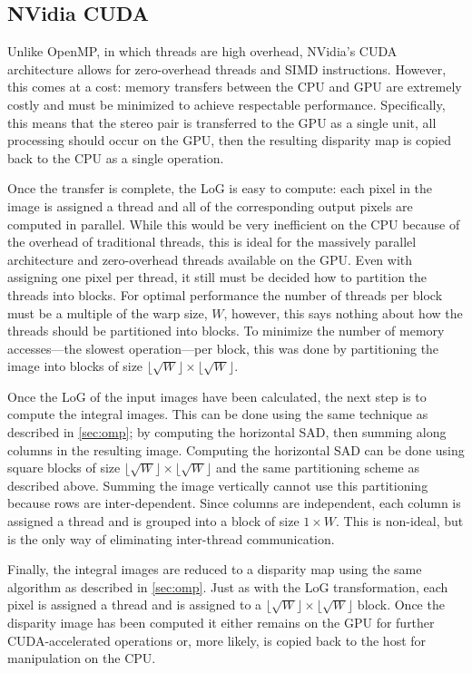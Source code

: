 \documentclass{article}
\let\orgautoref\autoref
\providecommand{\Cref}
        {\def\equationautorefname{Equation}%
         \def\figureautorefname{Figure}%
         \def\subfigureautorefname{Figure}%
         \def\Itemautorefname{Item}%
         \def\tableautorefname{Table}%
         \def\sectionautorefname{Section}%
         \def\subsectionautorefname{Section}%
         \def\subsubsectionautorefname{Section}%
         \def\chapterautorefname{Section}%
         \def\partautorefname{Part}%
         \orgautoref}
\newcommand{\floor}[1]{\lfloor#1\rfloor}
\begin{document}
\subsection{NVidia CUDA}
\label{sec:parallel-cuda}
Unlike OpenMP, in which threads are high overhead, NVidia's CUDA architecture
allows for zero-overhead threads and SIMD instructions. However, this comes at
a cost: memory transfers between the CPU and GPU are extremely costly and must
be minimized to achieve respectable performance. Specifically, this means that
the stereo pair is transferred to the GPU as a single unit, all processing
should occur on the GPU, then the resulting disparity map is copied back to the
CPU as a single operation.

Once the transfer is complete, the LoG is easy to compute: each pixel in the
image is assigned a thread and all of the corresponding output pixels are
computed in parallel. While this would be very inefficient on the CPU because
of the overhead of traditional threads, this is ideal for the massively
parallel architecture and zero-overhead threads available on the GPU. Even
with assigning one pixel per thread, it still must be decided how to partition
the threads into blocks. For optimal performance the number of threads per block
must be a multiple of the warp size, $W$, however, this says nothing about how the
threads should be partitioned into blocks. To minimize the number of memory
accesses---the slowest operation---per block, this was done by partitioning the
image into blocks of size $\floor{\sqrt{W}} \times \floor{\sqrt{W}}$.

Once the LoG of the input images have been calculated, the next step is to
compute the integral images. This can be done using the same technique as
described in \Cref{sec:omp}; by computing the horizontal SAD, then summing
along columns in the resulting image. Computing the horizontal SAD can be done
using square blocks of size $\floor{\sqrt{W}} \times \floor{\sqrt{W}}$ and the
same partitioning scheme as described above. Summing the image vertically
cannot use this partitioning because rows are inter-dependent. Since columns
are independent, each column is assigned a thread and is grouped into a block
of size $1 \times W$. This is non-ideal, but is the only way of eliminating
inter-thread communication.

Finally, the integral images are reduced to a disparity map using the same
algorithm as described in \Cref{sec:omp}. Just as with the LoG
transformation, each pixel is assigned a thread and is assigned to a
$\floor{\sqrt{W}} \times \floor{\sqrt{W}}$ block. Once the disparity image has
been computed it either remains on the GPU for further CUDA-accelerated
operations or, more likely, is copied back to the host for manipulation on the
CPU.
\end{document}
